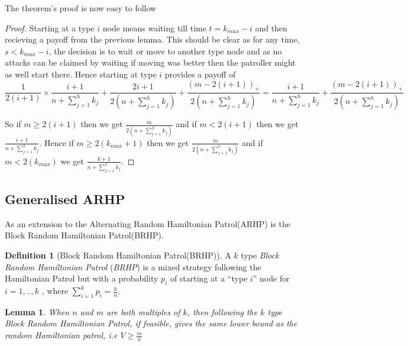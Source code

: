 \documentclass[a4paper,10pt]{article}
\newcommand{\denominator}{\ensuremath{n+\sum\limits_{j=1}^{h} k_{j}}}
\newcommand{\pospart}[1]{\left( #1 \right)_{+}}
\newtheorem{lemma}[theorem]{Lemma}
\theoremstyle{definition}
\newtheorem{definition}[theorem]{Definition}
\theoremstyle{definition}
\theoremstyle{remark}
\theoremstyle{definition}
\begin{document}
The theorem's proof is now easy to follow

\begin{proof}
Starting at a type $i$ node means waiting till time $t=k_{max}-i$ and then recieving a payoff from the previous lemma. This should be clear as for any time, $s < k_{max}-i$, the decision is to wait or move to another type node and as no attacks can be claimed by waiting if moving was better then the patroller might as well start there.
Hence starting at type $i$ provides a payoff of
$$\frac{1}{2(i+1)} \times \frac{i+1}{\denominator} + \frac{2i+1}{2 \left( \denominator \right)} +\frac{\pospart{m-2(i+1)}}{2 \left( \denominator \right)}=\frac{i+1}{\denominator} +\frac{\pospart{m-2(i+1)}}{2 \left( \denominator \right)}$$

So if $m \geq 2(i+1)$ then we get $\frac{m}{2 \left( \denominator \right)}$ and if $m < 2(i+1)$ then we get $\frac{i+1}{\denominator}$. 
Hence if $m \geq 2(k_{max}+1)$ then we get $\frac{m}{2 \left( \denominator \right)}$ and if $m < 2(k_{max})$ we get $\frac{k+1}{\denominator}$.
\end{proof}

\subsection{Generalised ARHP}
\label{Appendix:Generalised ARHP}

As an extension to the Alternating Random Hamiltonian Patrol(ARHP) is the Block Random Hamiltonian Patrol(BRHP).

\begin{definition}[Block Random Hamiltonian Patrol(BRHP)]
A $k$ type \textit{Block Random Hamiltonian Patrol} (\textit{BRHP}) is a mixed strategy following the Hamiltonian Patrol but with a probability $p_{i}$ of starting at a ``type $i$'' node for $i=1,..,k$ , where $\sum\limits_{i=1}^{k} p_{i}=\frac{k}{n}$.
\end{definition}

\begin{lemma}
When $n$ and $m$ are both multiples of $k$, then following the $k$ type Block Random Hamiltonian Patrol, if feasible, gives the same lower bound as the random Hamiltonian patrol, i.e $V \geq \frac{m}{n}$
\end{lemma}
\end{document}
